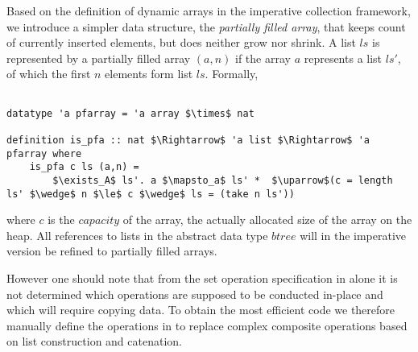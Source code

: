 Based on the definition of dynamic arrays in the 
imperative collection framework,
we introduce a simpler data structure,
the \textit{partially filled array},
that keeps count of currently inserted elements,
but does neither grow nor shrink.
A list $ls$ is represented by a partially filled array $(a,n)$
if the array $a$ represents a list $ls'$, of which the first $n$
elements form list $ls$.
Formally,

\begin{lstlisting}[mathescape=true, language=Isabelle]

datatype 'a pfarray = 'a array $\times$ nat

definition is_pfa :: nat $\Rightarrow$ 'a list $\Rightarrow$ 'a pfarray where
    is_pfa c ls (a,n) =
        $\exists_A$ ls'. a $\mapsto_a$ ls' *  $\uparrow$(c = length ls' $\wedge$ n $\le$ c $\wedge$ ls = (take n ls'))
\end{lstlisting}

where $c$ is the $capacity$ of the array,
the actually allocated size of the array on the heap.
All references to lists in the abstract data type $btree$
will in the imperative version be refined to partially filled arrays.

However one should note that
from the set operation specification in  alone
it is not determined which operations are supposed to be conducted
in-place and which will require copying data.
To obtain the most efficient code we therefore manually
define the operations in  to replace complex composite
operations based on list construction and catenation.

